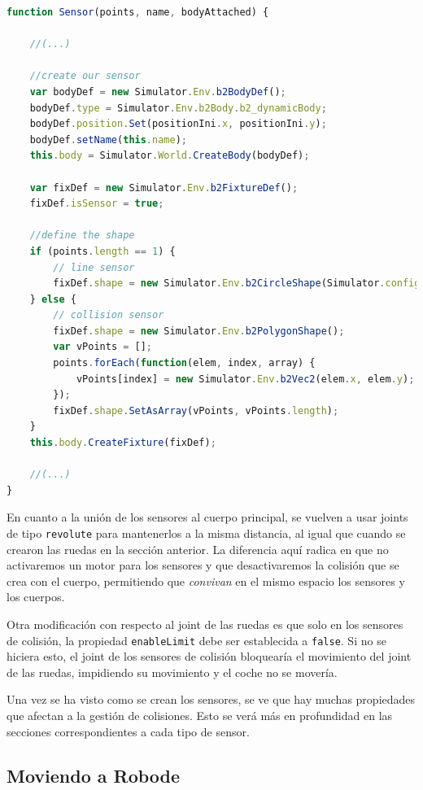 \begin{lstlisting}[language={Javascript},label={code:creation-sensor}, caption={Función que construye un sensor de Robode.}]
function Sensor(points, name, bodyAttached) {

    //(...)

    //create our sensor
    var bodyDef = new Simulator.Env.b2BodyDef();
    bodyDef.type = Simulator.Env.b2Body.b2_dynamicBody;
    bodyDef.position.Set(positionIni.x, positionIni.y);
    bodyDef.setName(this.name);
    this.body = Simulator.World.CreateBody(bodyDef);

    var fixDef = new Simulator.Env.b2FixtureDef();
    fixDef.isSensor = true;

    //define the shape
    if (points.length == 1) {
        // line sensor
        fixDef.shape = new Simulator.Env.b2CircleShape(Simulator.config.radiusInitSensorLine);
    } else {
        // collision sensor
        fixDef.shape = new Simulator.Env.b2PolygonShape();
        var vPoints = [];
        points.forEach(function(elem, index, array) {
            vPoints[index] = new Simulator.Env.b2Vec2(elem.x, elem.y);
        });
        fixDef.shape.SetAsArray(vPoints, vPoints.length);
    }
    this.body.CreateFixture(fixDef);

    //(...)
}
\end{lstlisting}

En cuanto a la unión de los sensores al cuerpo principal, se vuelven a usar joints de tipo \texttt{revolute} para mantenerlos a la misma distancia, al igual que cuando se crearon las ruedas en la sección anterior. La diferencia aquí radica en que no activaremos un motor para los sensores y que desactivaremos la colisión que se crea con el cuerpo, permitiendo que \emph{convivan} en el mismo espacio los sensores y los cuerpos.

Otra modificación con respecto al joint de las ruedas es que solo en los sensores de colisión, la propiedad \texttt{enableLimit} debe ser establecida a \texttt{false}. Si no se hiciera esto, el joint de los sensores de colisión bloquearía el movimiento del joint de las ruedas, impidiendo su movimiento y el coche no se movería.

Una vez se ha visto como se crean los sensores, se ve que hay muchas propiedades que afectan a la gestión de colisiones. Esto se verá más en profundidad en las secciones correspondientes a cada tipo de sensor.

\subsection{Moviendo a Robode}
\label{moviendo-robode}

